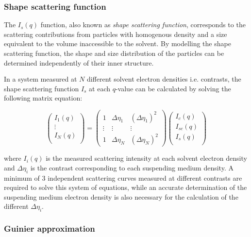 \subsubsection{Shape scattering function}
The $I_s(q)$ function, also known as \emph{shape scattering function}, corresponds to the scattering contributions from particles with homogenous density and a size equivalent to the volume inaccessible to the solvent. By modelling the shape scattering function, the shape and size distribution of the particles can be determined independently of their inner structure.

In a system measured at $N$ different solvent electron densities i.e. contrasts, the shape scattering function $I_s$ at each $q$-value can be calculated by solving the following matrix equation:

\begin{equation}
  \begin{pmatrix}
  I_1(q) \\
  \vdots \\
  I_N(q) \\
 \end{pmatrix}
  = 
 \begin{pmatrix}
  1 & \Delta \eta_1 &  \left( \Delta \eta_1 \right)^2 \\
  \vdots  & \vdots  & \vdots  \\
  1 & \Delta \eta_N &  \left( \Delta \eta_N \right)^2 
 \end{pmatrix}
 \begin{pmatrix}
  I_c(q) \\
  I_{sc}(q) \\
  I_s(q) \\
 \end{pmatrix}
\end{equation}

where $I_i (q)$ is the measured scattering intensity at each solvent electron density and $\Delta \eta _i$ is the contrast corresponding to each suspending medium density. A minimum of 3 independent scattering curves measured at different contrasts are required to solve this system of equations, while an accurate determination of the suspending medium electron density is also necessary for the calculation of the different $\Delta \eta _i$.

\subsubsection{Guinier approximation}
\label{sec:TheoryGuinier}

